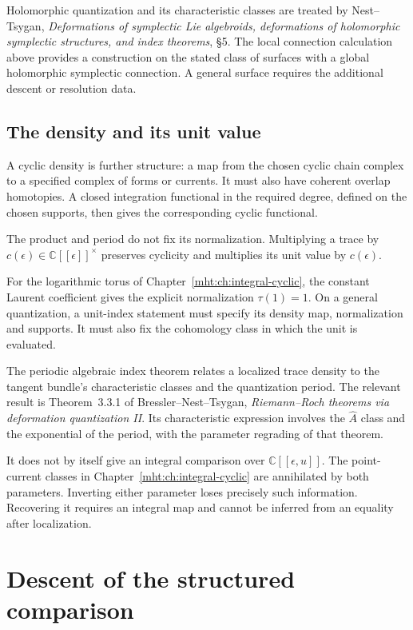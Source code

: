 Holomorphic quantization and its characteristic classes are
treated by Nest--Tsygan, \emph{Deformations of symplectic Lie
algebroids, deformations of holomorphic symplectic structures,
and index theorems}, \S5. The local connection calculation above
provides a construction on the stated class of surfaces with a
global holomorphic symplectic connection. A general surface
requires the additional descent or resolution data.

\subsection*{The density and its unit value}

A cyclic density is further structure: a map from the chosen cyclic
chain complex to a specified complex of forms or currents.
It must also have coherent overlap homotopies. A closed integration
functional in the required degree, defined on the chosen supports,
then gives the corresponding cyclic functional.

The product and period do not fix its normalization. Multiplying
a trace by $c(\epsilon)\in\mathbb C[[\epsilon]]^\times$ preserves
cyclicity and multiplies its unit value by $c(\epsilon)$.

For the logarithmic torus of
Chapter~\ref{mht:ch:integral-cyclic}, the constant Laurent
coefficient gives the explicit normalization $\tau(1)=1$.
On a general quantization, a unit-index statement must specify
its density map, normalization and supports. It must also fix
the cohomology class in which the unit is evaluated.

The periodic algebraic index theorem relates a localized trace
density to the tangent bundle's characteristic classes and the
quantization period. The relevant result is Theorem~3.3.1 of
Bressler--Nest--Tsygan, \emph{Riemann--Roch theorems via
deformation quantization II}. Its characteristic expression involves the
$\widehat A$ class and the exponential of the period, with the
parameter regrading of that theorem.

It does not by itself give
an integral comparison over $\mathbb C[[\epsilon,u]]$.
The point-current classes in
Chapter~\ref{mht:ch:integral-cyclic} are annihilated by both
parameters. Inverting either parameter loses precisely such
information. Recovering it requires an integral map and cannot
be inferred from an equality after localization.

\section{Descent of the structured comparison}

